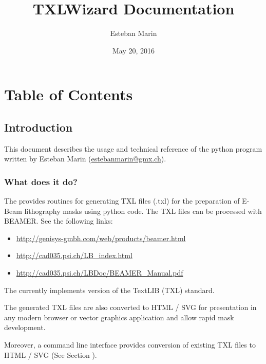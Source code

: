 \documentclass[letterpaper,10pt,english]{sphinxmanual}
\title{TXLWizard Documentation}
\date{May 20, 2016}
\author{Esteban Marin}
\begin{document}
\maketitle
\tableofcontents
{}\label{index::doc}



\chapter{Table of Contents}
\label{index:table-of-contents}\label{index:welcome-to-txlwriter-s-documentation}

\section{Introduction}
\label{Chapters/10_Introduction:introduction}\label{Chapters/10_Introduction::doc}
This document describes the usage and technical reference of the python program 
written by Esteban Marin (\href{mailto:estebanmarin@gmx.ch}{estebanmarin@gmx.ch}).


\subsection{What does it do?}
\label{Chapters/10_Introduction:what-does-it-do}
The  provides routines for generating TXL files (.txl) for
the preparation of E-Beam lithography masks using python code. The TXL files can be processed with BEAMER.
See the following links:
\begin{itemize}
\item {} 
\url{http://genisys-gmbh.com/web/products/beamer.html}

\item {} 
\url{http://cad035.psi.ch/LB\_index.html}

\item {} 
\url{http://cad035.psi.ch/LBDoc/BEAMER\_Manual.pdf}

\end{itemize}

The  currently implements version  of the TextLIB (TXL) standard.

The generated TXL files are also converted to HTML / SVG for presentation in any modern browser or
vector graphics application and allow rapid mask development.

Moreover, a command line interface  provides conversion of existing TXL files to HTML / SVG
(See Section {\hyperref[Chapters/30_TXLConverter:sec\string-txlconverter]{}}).
\end{document}
